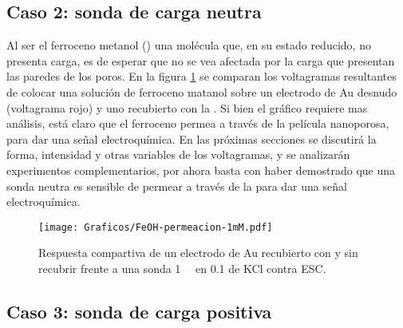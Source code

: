 	\subsection{Caso 2: sonda de carga neutra}

		Al ser el ferroceno metanol (\fc) una molécula que, en su estado reducido, no presenta carga, es de esperar que no se vea afectada por la carga que presentan las paredes de los poros. En la figura \ref{fig:permeacion} se comparan los voltagramas resultantes de colocar una solución de ferroceno matanol sobre un electrodo de Au desnudo (voltagrama rojo) y uno recubierto con la \pdm.  Si bien el gráfico  requiere mas análisis, está claro que el ferroceno permea a través de la película nanoporosa, para dar una señal electroquímica. En las próximas secciones se discutirá la forma, intensidad y otras variables de los voltagramas, y se analizarán experimentos complementarios, por ahora basta con haber demostrado que una sonda neutra es sensible de permear a través de la \pdm\space para dar una señal electroquímica.

		\begin{figure}[ht]
				\centering
		 	    \texttt{[image: Graficos/FeOH-permeacion-1mM.pdf]}
		        \caption[Permeación ferroceno metanol]{Respuesta compartiva de un electrodo de Au recubierto con \pdmF\space y sin recubrir frente a una sonda \fc \SI{1}{\milli\Molar} en \SI{0.1}{\Molar} de KCl contra ESC.}
		        \label{fig:permeacion}
		      	\end{figure}

	\subsection{Caso 3: sonda de carga positiva}

